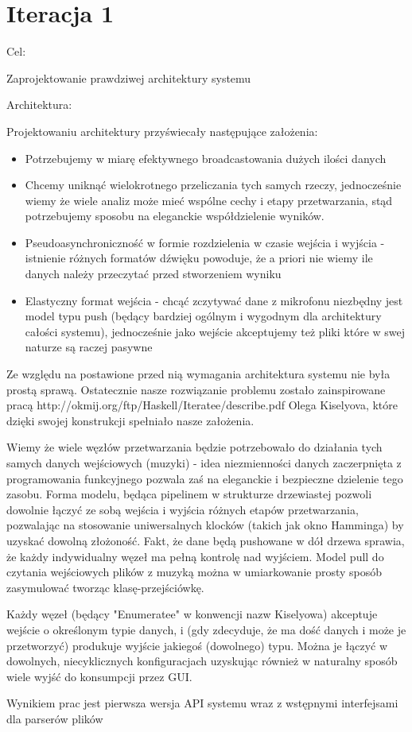 \section{Iteracja 1}
\begin{Note}

Cel:

    Zaprojektowanie prawdziwej architektury systemu

Architektura:

Projektowaniu architektury przyświecały następujące założenia:
\begin{itemize}

    \item Potrzebujemy w miarę efektywnego broadcastowania dużych ilości danych
    \item Chcemy uniknąć wielokrotnego przeliczania tych samych rzeczy, jednocześnie wiemy że wiele analiz może mieć wspólne cechy i etapy przetwarzania, stąd potrzebujemy sposobu na eleganckie współdzielenie wyników.
    \item Pseudoasynchroniczność w formie rozdzielenia w czasie wejścia i wyjścia - istnienie różnych formatów dźwięku powoduje, że a priori nie wiemy ile danych należy przeczytać przed stworzeniem wyniku
    \item Elastyczny format wejścia - chcąć zczytywać dane z mikrofonu niezbędny jest model typu push (będący bardziej ogólnym i wygodnym dla architektury całości systemu), jednocześnie jako wejście akceptujemy też pliki które w swej naturze są raczej pasywne
\end{itemize}

Ze względu na postawione przed nią wymagania architektura systemu nie była prostą sprawą. Ostatecznie nasze rozwiązanie problemu zostało zainspirowane pracą http://okmij.org/ftp/Haskell/Iteratee/describe.pdf Olega Kiselyova, które dzięki swojej konstrukcji spełniało nasze założenia.

Wiemy że wiele węzłów przetwarzania będzie potrzebowało do działania tych samych danych wejściowych (muzyki) - idea niezmienności danych zaczerpnięta z programowania funkcyjnego pozwala zaś na eleganckie i bezpieczne dzielenie tego zasobu. Forma modelu, będąca pipelinem w strukturze drzewiastej pozwoli dowolnie łączyć ze sobą wejścia i wyjścia różnych etapów przetwarzania, pozwalając na stosowanie uniwersalnych klocków (takich jak okno Hamminga) by uzyskać dowolną złożoność. Fakt, że dane będą pushowane w dół drzewa sprawia, że każdy indywidualny węzeł ma pełną kontrolę nad wyjściem. Model pull do czytania wejściowych plików z muzyką można w umiarkowanie prosty sposób zasymulować tworząc klasę-przejściówkę.

Każdy węzeł (będący "Enumeratee" w konwencji nazw Kiselyowa) akceptuje wejście o określonym typie danych, i (gdy zdecyduje, że ma dość danych i może je przetworzyć) produkuje wyjście jakiegoś (dowolnego) typu. Można je łączyć w dowolnych, niecyklicznych konfiguracjach uzyskując również w naturalny sposób wiele wyjść do konsumpcji przez GUI.

Wynikiem prac jest pierwsza wersja API systemu wraz z wstępnymi interfejsami dla parserów plików

\end{Note}
